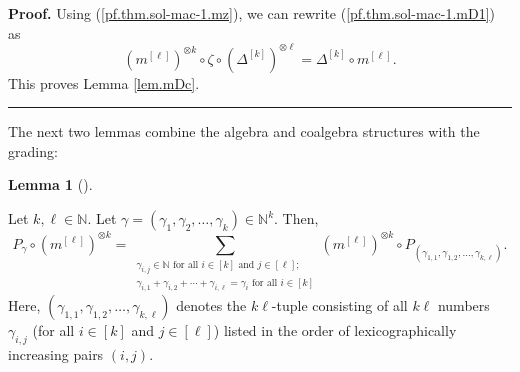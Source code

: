 \documentclass[numbers=enddot,12pt,final,onecolumn,notitlepage]{scrartcl}%
\theoremstyle{definition}
\newtheorem{lem}[theo]{Lemma}
\newenvironment{lemma}[1][]
{\begin{lem}[#1]\begin{leftbar}}
{\end{leftbar}\end{lem}}
\newenvironment{proof}[1][Proof]{\noindent\textbf{#1.} }{\ \rule{0.5em}{0.5em}}
\let\sumnonlimits\sum
\renewcommand{\sum}{\sumnonlimits\limits}
\begin{document}
\begin{proof}
Using (\ref{pf.thm.sol-mac-1.mz}), we can rewrite (\ref{pf.thm.sol-mac-1.mD1})
as%
\[
\left(  m^{\left[  \ell\right]  }\right)  ^{\otimes k}\circ\zeta\circ\left(
\Delta^{\left[  k\right]  }\right)  ^{\otimes\ell}=\Delta^{\left[  k\right]
}\circ m^{\left[  \ell\right]  }.
\]
This proves Lemma \ref{lem.mDc}.
\end{proof}

The next two lemmas combine the algebra and coalgebra structures with the grading:

\begin{lemma}
\label{lem.Pm}Let $k,\ell\in\mathbb{N}$. Let $\gamma=\left(  \gamma_{1}%
,\gamma_{2},\ldots,\gamma_{k}\right)  \in\mathbb{N}^{k}$. Then,%
\[
P_{\gamma}\circ\left(  m^{\left[  \ell\right]  }\right)  ^{\otimes k}%
=\sum_{\substack{\gamma_{i,j}\in\mathbb{N}\text{ for all }i\in\left[
k\right]  \text{ and }j\in\left[  \ell\right]  ;\\\gamma_{i,1}+\gamma
_{i,2}+\cdots+\gamma_{i,\ell}=\gamma_{i}\text{ for all }i\in\left[  k\right]
}}\left(  m^{\left[  \ell\right]  }\right)  ^{\otimes k}\circ P_{\left(
\gamma_{1,1},\gamma_{1,2},\ldots,\gamma_{k,\ell}\right)  }.
\]
Here, $\left(  \gamma_{1,1},\gamma_{1,2},\ldots,\gamma_{k,\ell}\right)  $
denotes the $k\ell$-tuple consisting of all $k\ell$ numbers $\gamma_{i,j}$
(for all $i\in\left[  k\right]  $ and $j\in\left[  \ell\right]  $) listed in
the order of lexicographically increasing pairs $\left(  i,j\right)  $.
\end{lemma}
\end{document}
